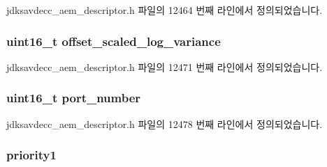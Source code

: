 jdksavdecc\+\_\+aem\+\_\+descriptor.\+h 파일의 12464 번째 라인에서 정의되었습니다.

\subsubsection[{\texorpdfstring{offset\+\_\+scaled\+\_\+log\+\_\+variance}{offset_scaled_log_variance}}]{\setlength{\rightskip}{0pt plus 5cm}uint16\+\_\+t offset\+\_\+scaled\+\_\+log\+\_\+variance}\hypertarget{structjdksavdecc__descriptor__avb__interface_aa6a39c2a4a7071642573bb3b4e0a0a54}{}\label{structjdksavdecc__descriptor__avb__interface_aa6a39c2a4a7071642573bb3b4e0a0a54}


jdksavdecc\+\_\+aem\+\_\+descriptor.\+h 파일의 12471 번째 라인에서 정의되었습니다.

\subsubsection[{\texorpdfstring{port\+\_\+number}{port_number}}]{\setlength{\rightskip}{0pt plus 5cm}uint16\+\_\+t port\+\_\+number}\hypertarget{structjdksavdecc__descriptor__avb__interface_af0afa7bb85d49ac5ff873fad86a48ec5}{}\label{structjdksavdecc__descriptor__avb__interface_af0afa7bb85d49ac5ff873fad86a48ec5}


jdksavdecc\+\_\+aem\+\_\+descriptor.\+h 파일의 12478 번째 라인에서 정의되었습니다.

\subsubsection[{\texorpdfstring{priority1}{priority1}}]{ priority1}\hypertarget{structjdksavdecc__descriptor__avb__interface_af98f08e3d1b016cd549310197ba8673c}{}\label{structjdksavdecc__descriptor__avb__interface_af98f08e3d1b016cd549310197ba8673c}


